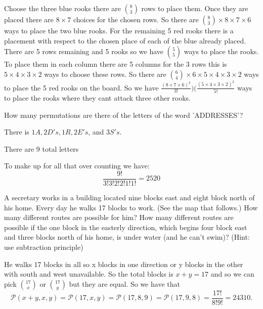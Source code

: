 \begin{sol}

Choose the three blue rooks there are $\binom{8}{3}$ rows to place them. Once they are placed there are $8 \times 7$ choices for the chosen rows. So there are $\binom{8}{3} \times 8 \times 7 \times 6$ ways to place the two blue rooks. 
 For the remaining 5 red rooks there is a placement with respect to the chosen place of each of the blue already placed. There are 5 rows remaining and 5 rooks so we have $\binom{5}{5}$ ways to place the rooks. 
 To place them in each column there are 5 columns for the 3 rows this is $5 \times 4 \times 3 \times 2$ ways to choose these rows.
 So there are $\binom{6}{4} \times 6 \times 5 \times 4 \times 3 \times 2$ ways to place the 5 red rooks on the board.
 So we have \(\frac{(8 \times 7 \times 6)^{2}}{3!})(\frac{(5 \times 4 \times 3 \times 2)^{2}}{5!}\) 
ways to place the rooks where they cant attack three other rooks.
\end{sol}

\bigskip

\begin{prob}
How many permutations are there of the letters of the word 'ADDRESSES'?
\end{prob}
\medskip

\begin{sol}

There is $1 A, 2 D's, 1 R, 2 E's$, and $3 S's$.

There are 9 total letters

To make up for all that over counting we have: \[ \frac{9!}{3!3!2!2!1!1!} = 2520\]
\end{sol}
\bigskip


\medskip

\begin{prob}
A secretary works in a building located nine blocks east and eight block north of his home.
Every day he walks 17 blocks to work. (See the map that follows.)
\smallskip
How many different routes are possible for him?
\smallskip
How many different routes are possible if the one block in the easterly direction, which begins four block east and three blocks north of his home, is under water (and he can't swim)? (Hint: use subtraction principle)
\end{prob}
\medskip

\begin{sol}
He walks 17 blocks in all so x blocks in one direction or y blocks in the other with south and west unavailable. So the total blocks is $x + y = 17$ and so we can pick $\binom{17}{x}$ or $\binom{17}{y}$ but they are equal. So we have that \[\mathcal{P}(x+y, x, y) = \mathcal{P}(17, x, y) = \mathcal{P}(17, 8, 9) = \mathcal{P}(17, 9, 8) = \frac{17!}{8!9!} = 24310.\]
\end{sol}

\vspace{0.5in}

